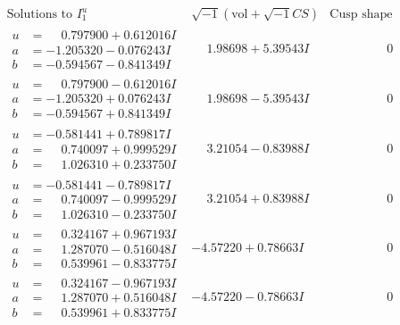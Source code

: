 \documentclass[1p]{elsarticle_modified}
\theoremstyle{definition}
\newcommand{\I}{\sqrt{-1}}
\begin{document}
$$\begin{array}{c|c|c}  
\text{Solutions to }I^u_{1}& \I (\text{vol} + \sqrt{-1}CS) & \text{Cusp shape}\\
 \hline 
\begin{aligned}
u &= \phantom{-}0.797900 + 0.612016 I \\
a &= -1.205320 - 0.076243 I \\
b &= -0.594567 - 0.841349 I\end{aligned}
 & \phantom{-}1.98698 + 5.39543 I & \phantom{-0.000000 } 0 \\ \hline\begin{aligned}
u &= \phantom{-}0.797900 - 0.612016 I \\
a &= -1.205320 + 0.076243 I \\
b &= -0.594567 + 0.841349 I\end{aligned}
 & \phantom{-}1.98698 - 5.39543 I & \phantom{-0.000000 } 0 \\ \hline\begin{aligned}
u &= -0.581441 + 0.789817 I \\
a &= \phantom{-}0.740097 + 0.999529 I \\
b &= \phantom{-}1.026310 + 0.233750 I\end{aligned}
 & \phantom{-}3.21054 - 0.83988 I & \phantom{-0.000000 } 0 \\ \hline\begin{aligned}
u &= -0.581441 - 0.789817 I \\
a &= \phantom{-}0.740097 - 0.999529 I \\
b &= \phantom{-}1.026310 - 0.233750 I\end{aligned}
 & \phantom{-}3.21054 + 0.83988 I & \phantom{-0.000000 } 0 \\ \hline\begin{aligned}
u &= \phantom{-}0.324167 + 0.967193 I \\
a &= \phantom{-}1.287070 - 0.516048 I \\
b &= \phantom{-}0.539961 - 0.833775 I\end{aligned}
 & -4.57220 + 0.78663 I & \phantom{-0.000000 } 0 \\ \hline\begin{aligned}
u &= \phantom{-}0.324167 - 0.967193 I \\
a &= \phantom{-}1.287070 + 0.516048 I \\
b &= \phantom{-}0.539961 + 0.833775 I\end{aligned}
 & -4.57220 - 0.78663 I & \phantom{-0.000000 } 0 \\ \hline\begin{aligned}

\end{aligned}
\end{array}$$
\end{document}
